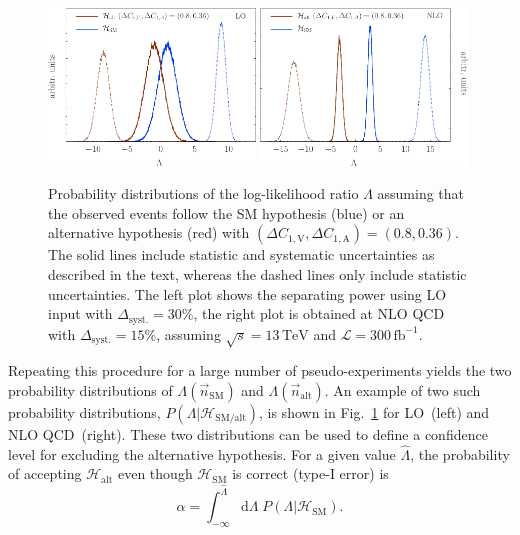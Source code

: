 \documentclass{JHEP3}
\newcommand{\TeV}{\mathrm{TeV}}
\newcommand{\SM}{\mathrm{SM}}
\newcommand{\alt}{\mathrm{alt}}
\def\invfb {\mathrm{fb}^{-1}}
\def\hLambda {\hat{\Lambda}}
\def\DConeA{\Delta C_{1,\mathrm{A}}}
\def\DConeV{\Delta C_{1,\mathrm{V}}}
\def\HSM{\mathcal{H}_{\mathrm{SM}}}
\begin{document}
\begin{figure}[t]
\centering 
\includegraphics[width=0.49\textwidth]{./LogLikelihoods_LO.pdf}
\hfill
\includegraphics[width=0.49\textwidth]{./LogLikelihoods_NLO.pdf}
\caption{\label{fig:vii}
Probability distributions of the log-likelihood ratio $\Lambda$ assuming that the observed events follow the SM hypothesis (blue) or an alternative hypothesis (red) 
with $(\DConeV,\DConeA)=(0.8,0.36)$.
The solid lines include statistic and systematic uncertainties as described in the text, whereas the dashed lines only include statistic uncertainties.
The left plot shows the separating power using LO input with $\Delta_\mathrm{syst.}=30\%$, 
the right plot is obtained at NLO QCD with $\Delta_\mathrm{syst.}=15\%$, assuming $\sqrt{s}=13\,\TeV$ and $\mathcal{L}=300\,\invfb$.
}
\end{figure}
Repeating this procedure for a large number of pseudo-experiments yields the two probability distributions of $\Lambda(\vec{n}_\mathrm{SM})$ and $\Lambda(\vec{n}_\mathrm{alt})$. 
An example of two such probability distributions, $P(\Lambda|\mathcal{H}_{\mathrm{SM/alt}})$, is shown in Fig.~\ref{fig:vii} for LO~(left) and NLO QCD~(right).
These two distributions can be used to define a confidence level for excluding the alternative hypothesis.
For a given value $\hat{\Lambda}$, the probability of accepting $\mathcal{H}_{\alt}$ even though $\mathcal{H}_{\SM}$ is correct (type-I error) is
\begin{equation}
    \alpha = \int^{\hLambda}_{-\infty} \mathrm{d}\Lambda \; P(\Lambda | {\HSM}).
\end{equation}
\end{document}
